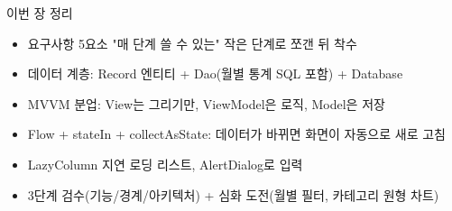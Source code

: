 \begin{tcbsummary}{이번 장 정리}
\begin{itemize}
  \item 요구사항 5요소 "매 단계 쓸 수 있는" 작은 단계로 쪼갠 뒤 착수
  \item 데이터 계층: Record 엔티티 + Dao(월별 통계 SQL 포함) + Database
  \item MVVM 분업: View는 그리기만, ViewModel은 로직, Model은 저장
  \item Flow + stateIn + collectAsState: 데이터가 바뀌면 화면이 자동으로 새로 고침
  \item LazyColumn 지연 로딩 리스트, AlertDialog로 입력
  \item 3단계 검수(기능/경계/아키텍처) + 심화 도전(월별 필터, 카테고리 원형 차트)
\end{itemize}

\end{tcbsummary}
